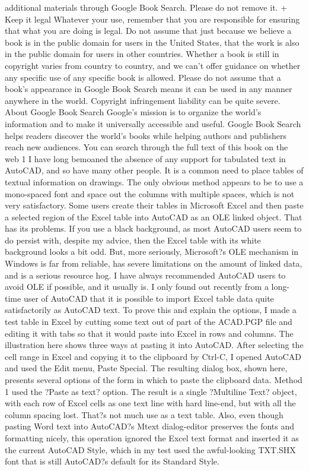 \documentclass[a4paper]{article}
\begin{document}
{additional materials through Google Book Search. Please do not remove it. 
+ Keep it legal Whatever your use, remember that you are responsible for ensuring that what you are doing is legal. Do not assume that just 
because we believe a book is in the public domain for users in the United States, that the work is also in the public domain for users in other 
countries. Whether a book is still in copyright varies from country to country, and we can't offer guidance on whether any specific use of 
any specific book is allowed. Please do not assume that a book's appearance in Google Book Search means it can be used in any manner 
anywhere in the world. Copyright infringement liability can be quite severe. 
About Google Book Search 
Google's mission is to organize the world's information and to make it universally accessible and useful. Google Book Search helps readers 
discover the world's books while helping authors and publishers reach new audiences. You can search through the full text of this book on the web 1
I have long bemoaned the absence of any support for tabulated text in AutoCAD, and so have many other people. It is a common need to place tables of textual information on drawings. The only obvious method appears to be to use a mono-spaced font and space out the columns with multiple spaces, which is not very satisfactory.
Some users create their tables in Microsoft Excel and then paste a selected region of the Excel table into AutoCAD as an OLE linked object. That has its problems. If you use a black background, as most AutoCAD users seem to do persist with, despite my advice, then the Excel table with its white background looks a bit odd. But, more seriously, Microsoft?s OLE mechanism in Windows is far from reliable, has severe limitations on the amount of linked data, and is a serious resource hog. I have always recommended AutoCAD users to avoid OLE if possible, and it usually is.
I only found out recently from a long-time user of AutoCAD that it is possible to import Excel table data quite satisfactorily as AutoCAD text. To prove this and explain the options, I made a test table in Excel by cutting some text out of part of the ACAD.PGP file and editing it with tabs so that it would paste into Excel in rows and columns. The illustration here shows three ways at pasting it into AutoCAD. After selecting the cell range in Excel and copying it to the clipboard by Ctrl-C, I opened AutoCAD and used the Edit menu, Paste Special. The resulting dialog box, shown here, presents several options of the form in which to paste the clipboard data.
Method 1 used the ?Paste as text? option. The result is a single ?Multiline Text? object, with each row of Excel cells as one text line with hard line-end, but with all the column spacing lost. That?s not much use as a text table. Also, even though pasting Word text into AutoCAD?s Mtext dialog-editor preserves the fonts and formatting nicely, this operation ignored the Excel text format and inserted it as the current AutoCAD Style, which in my test used the awful-looking TXT.SHX font that is still AutoCAD?s default for its Standard Style.
}
\end{document}
